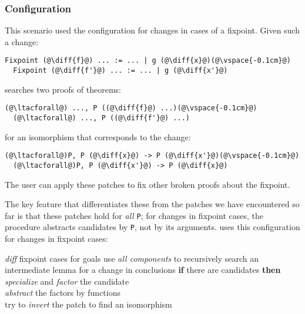 \subsubsection{Configuration}

This scenario used the configuration for changes in cases of a fixpoint.
Given such a change:

\begin{lstlisting}[language=coq]
  Fixpoint (@\diff{f}@) ... := ... | g (@\diff{x}@)(@\vspace{-0.1cm}@)
  Fixpoint (@\diff{f'}@) ... := ... | g (@\diff{x'}@)
\end{lstlisting}
\sysname searches two proofs of theorems:

\begin{lstlisting}[language=coq]
  (@\ltacforall@) ..., P ((@\diff{f}@) ...)(@\vspace{-0.1cm}@)
  (@\ltacforall@) ..., P ((@\diff{f'}@) ...)
\end{lstlisting}
for an isomorphism that corresponds to the change:

\begin{lstlisting}[language=coq]
  (@\ltacforall@)P, P (@\diff{x}@) -> P (@\diff{x'}@)(@\vspace{-0.1cm}@)
  (@\ltacforall@)P, P (@\diff{x'}@) -> P (@\diff{x}@)
\end{lstlisting}
The user can apply these patches to fix other broken proofs about the fixpoint.

The key feature that differentiates these from the patches we have encountered so far is that
these patches hold for \emph{all} \lstinline{P}; for changes in fixpoint cases, the procedure abstracts
candidates by \lstinline{P}, not by its arguments.
\sysname uses this configuration for changes in fixpoint cases:

\begin{algorithm}
\footnotesize
\begin{algorithmic}[1]
    \STATE \textit{diff} fixpoint cases for goals
    \STATE use \textit{all components} to recursively search an intermediate lemma for a change in conclusions
    \STATE \textbf{if} there are candidates \textbf{then}
    \STATE \hspace*{1em} \textit{specialize} and \textit{factor} the candidate \\
           \hspace*{1em} \textit{abstract} the factors by functions \\
           \hspace*{1em} try to \textit{invert} the patch to find an isomorphism 
\end{algorithmic}
\end{algorithm}

